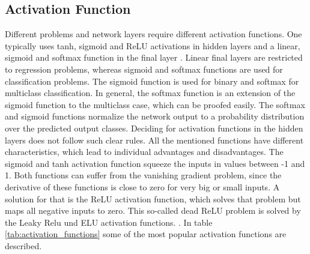 \subsection{Activation Function}
Different problems and network layers require different activation functions. One typically uses tanh, sigmoid and ReLU activations in hidden layers and a linear, sigmoid and softmax function in the final layer \cite{Brownlee2021}. Linear final layers are restricted to regression problems, whereas sigmoid and softmax functions are used for classification problems. The sigmoid function is used for binary and softmax for multiclass classification. In general, the softmax function is an extension of the sigmoid function to the multiclass case, which can be proofed easily. The softmax and sigmoid functions normalize the network output to a probability distribution over the predicted output classes. Deciding for activation functions in the hidden layers does not follow such clear rules. All the mentioned functions have different characteristics, which lead to individual advantages and disadvantages. The sigmoid and tanh activation function squeeze the inputs in values between -1 and 1. Both functions can suffer from the vanishing gradient problem, since the derivative of these functions is close to zero for very big or small inputs. A solution for that is the ReLU activation function, which solves that problem but maps all negative inputs to zero. This so-called dead ReLU problem is solved by the Leaky Relu und ELU activation functions.  \cite{Brownlee2021}. In table \ref{tab:activation_functions} some of the most popular activation functions are described.

